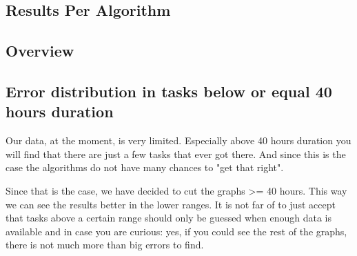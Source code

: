 \newpage{}

\begin{landscape}

\hypertarget{results-per-algorithm}{%
\section{Results Per Algorithm}\label{results-per-algorithm}}

\subsection{Overview}



\end{landscape}

\subsection{Error distribution in tasks below or equal 40 hours duration}

Our data, at the moment, is very limited. 
Especially above 40 hours duration you will find that there are just a few tasks that ever got there.
And since this is the case the algorithms do not have many chances to "get that right".

Since that is the case, we have decided to cut the graphs >= 40 hours. 
This way we can see the results better in the lower ranges.
It is not far of to just accept that tasks above a certain range should only be guessed when
enough data is available and in case you are curious: yes, if you could see the rest of the graphs, there
is not much more than big errors to find.

\newpage




